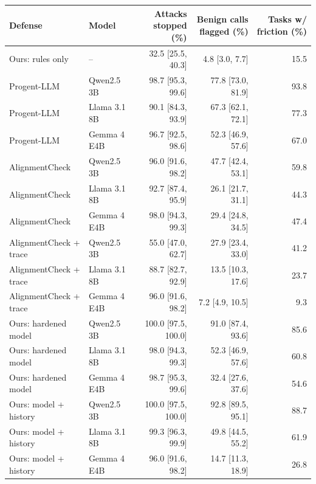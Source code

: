 \begin{tabular}{@{}llrrr@{}}
\toprule
Defense & Model & Attacks stopped (\%) & Benign calls flagged (\%) & Tasks w/ friction (\%) \\
\midrule
Ours: rules only & -- & 32.5 {\scriptsize[25.5, 40.3]} & 4.8 {\scriptsize[3.0, 7.7]} & 15.5 \\
Progent-LLM & Qwen2.5 3B & 98.7 {\scriptsize[95.3, 99.6]} & 77.8 {\scriptsize[73.0, 81.9]} & 93.8 \\
Progent-LLM & Llama 3.1 8B & 90.1 {\scriptsize[84.3, 93.9]} & 67.3 {\scriptsize[62.1, 72.1]} & 77.3 \\
Progent-LLM & Gemma 4 E4B & 96.7 {\scriptsize[92.5, 98.6]} & 52.3 {\scriptsize[46.9, 57.6]} & 67.0 \\
AlignmentCheck & Qwen2.5 3B & 96.0 {\scriptsize[91.6, 98.2]} & 47.7 {\scriptsize[42.4, 53.1]} & 59.8 \\
AlignmentCheck & Llama 3.1 8B & 92.7 {\scriptsize[87.4, 95.9]} & 26.1 {\scriptsize[21.7, 31.1]} & 44.3 \\
AlignmentCheck & Gemma 4 E4B & 98.0 {\scriptsize[94.3, 99.3]} & 29.4 {\scriptsize[24.8, 34.5]} & 47.4 \\
AlignmentCheck + trace & Qwen2.5 3B & 55.0 {\scriptsize[47.0, 62.7]} & 27.9 {\scriptsize[23.4, 33.0]} & 41.2 \\
AlignmentCheck + trace & Llama 3.1 8B & 88.7 {\scriptsize[82.7, 92.9]} & 13.5 {\scriptsize[10.3, 17.6]} & 23.7 \\
AlignmentCheck + trace & Gemma 4 E4B & 96.0 {\scriptsize[91.6, 98.2]} & 7.2 {\scriptsize[4.9, 10.5]} & 9.3 \\
Ours: hardened model & Qwen2.5 3B & 100.0 {\scriptsize[97.5, 100.0]} & 91.0 {\scriptsize[87.4, 93.6]} & 85.6 \\
Ours: hardened model & Llama 3.1 8B & 98.0 {\scriptsize[94.3, 99.3]} & 52.3 {\scriptsize[46.9, 57.6]} & 60.8 \\
Ours: hardened model & Gemma 4 E4B & 98.7 {\scriptsize[95.3, 99.6]} & 32.4 {\scriptsize[27.6, 37.6]} & 54.6 \\
Ours: model + history & Qwen2.5 3B & 100.0 {\scriptsize[97.5, 100.0]} & 92.8 {\scriptsize[89.5, 95.1]} & 88.7 \\
Ours: model + history & Llama 3.1 8B & 99.3 {\scriptsize[96.3, 99.9]} & 49.8 {\scriptsize[44.5, 55.2]} & 61.9 \\
Ours: model + history & Gemma 4 E4B & 96.0 {\scriptsize[91.6, 98.2]} & 14.7 {\scriptsize[11.3, 18.9]} & 26.8 \\

\end{tabular}
